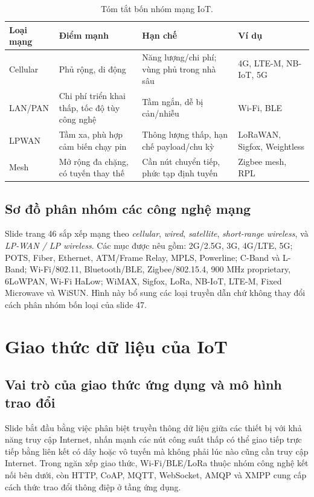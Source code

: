 \begin{table}[htbp]\centering\small
\caption{Tóm tắt bốn nhóm mạng IoT.}
\begin{tabularx}{\textwidth}{p{2.6cm}XXX}\toprule
Loại mạng & Điểm mạnh & Hạn chế & Ví dụ\\\midrule
Cellular & Phủ rộng, di động & Năng lượng/chi phí; vùng phủ trong nhà sâu & 4G, LTE-M, NB-IoT, 5G\\
LAN/PAN & Chi phí triển khai thấp, tốc độ tùy công nghệ & Tầm ngắn, dễ bị cản/nhiễu & Wi-Fi, BLE\\
LPWAN & Tầm xa, phù hợp cảm biến chạy pin & Thông lượng thấp, hạn chế payload/chu kỳ & LoRaWAN, Sigfox, Weightless\\
Mesh & Mở rộng đa chặng, có tuyến thay thế & Cần nút chuyển tiếp, phức tạp định tuyến & Zigbee mesh, RPL\\\bottomrule
\end{tabularx}\end{table}

\subsection{Sơ đồ phân nhóm các công nghệ mạng}
Slide trang 46 sắp xếp mạng theo \emph{cellular}, \emph{wired}, \emph{satellite}, \emph{short-range wireless}, và \emph{LP-WAN / LP wireless}. Các mục được nêu gồm: 2G/2.5G, 3G, 4G/LTE, 5G; POTS, Fiber, Ethernet, ATM/Frame Relay, MPLS, Powerline; C-Band và L-Band; Wi-Fi/802.11, Bluetooth/BLE, Zigbee/802.15.4, 900 MHz proprietary, 6LoWPAN, Wi-Fi HaLow; WiMAX, Sigfox, LoRa, NB-IoT, LTE-M, Fixed Microwave và WiSUN. Hình này bổ sung các loại truyền dẫn chứ không thay đổi cách phân nhóm bốn loại của slide 47.

\section{Giao thức dữ liệu của IoT}
\subsection{Vai trò của giao thức ứng dụng và mô hình trao đổi}
Slide bắt đầu bằng việc phân biệt truyền thông dữ liệu giữa các thiết bị với khả năng truy cập Internet, nhấn mạnh các nút công suất thấp có thể giao tiếp trực tiếp bằng liên kết có dây hoặc vô tuyến mà không phải lúc nào cũng cần truy cập Internet. Trong ngăn xếp giao thức, Wi-Fi/BLE/LoRa thuộc nhóm công nghệ kết nối bên dưới, còn HTTP, CoAP, MQTT, WebSocket, AMQP và XMPP cung cấp cách thức trao đổi thông điệp ở tầng ứng dụng. 

